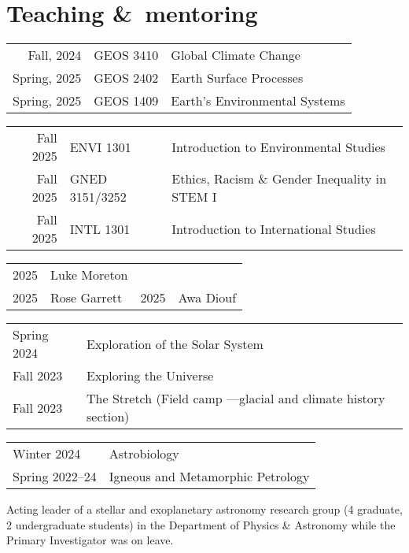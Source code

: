 \section{Teaching \&\ mentoring}
\begin{tabular}{r ll} 
	Fall, 2024 & GEOS 3410 & Global Climate Change\\
	Spring, 2025 & GEOS 2402 & Earth Surface Processes\\
	Spring, 2025 & GEOS 1409 & Earth's Environmental Systems\\
\end{tabular}

\begin{tabular}{r ll} 
	Fall 2025 & ENVI 1301 & Introduction to Environmental Studies \\
	Fall 2025 & GNED 3151/3252 & Ethics, Racism \& Gender Inequality in STEM I\\
	Fall 2025 & INTL 1301 & Introduction to International Studies
\end{tabular}

\begin{tabular}{ll|ll}
	2025\ongoing & Luke Moreton
	\\
	2025\ongoing & Rose Garrett
	&
	2025\ongoing & Awa Diouf
\end{tabular}

\begin{tabular}{l l}
	Spring 2024 & Exploration of the Solar System \\
	Fall 2023 & Exploring the Universe \\
	Fall 2023 & The Stretch \normalfont (Field camp ---glacial and climate history section)
\end{tabular}

\begin{tabular}{p{.15\linewidth} l} %
	Winter 2024 & Astrobiology\\
	Spring 2022--24 & Igneous and Metamorphic Petrology
\end{tabular}

Acting leader of a stellar and exoplanetary astronomy research group (4 graduate, 2 undergraduate students) in the Department of Physics \& Astronomy while the Primary Investigator was on leave.

